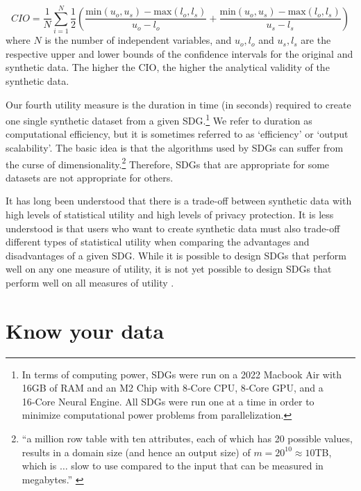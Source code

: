 \documentclass[runningheads]{llncs}
\begin{document}
\begin{equation}
    CIO = \frac{1}{N} \sum^{N}_{i=1} \frac{1}{2}\left(\frac{\text{min}(u_o,u_s) - \text{max}(l_o,l_s)}{u_o-l_o} + \frac{\text{min}(u_o,u_s) - \text{max}(l_o,l_s)}{u_s-l_s}\right)
\end{equation}
where $N$ is the number of independent variables, and $u_o,l_o$ and $u_s,l_s$ are the respective upper and lower bounds of the confidence intervals for the original and synthetic data.   The higher the CIO, the higher the analytical validity of the synthetic data.  

Our fourth utility measure is the duration in time (in seconds) required to create one single synthetic dataset from a given SDG.\footnote{In terms of computing power, SDGs were run on a 2022 Macbook Air with 16GB of RAM and an M2 Chip with 8‑Core CPU, 8‑Core GPU, and a 16‑Core Neural Engine.  All SDGs were run one at a time in order to minimize computational power problems from parallelization.}  We refer to duration as computational efficiency, but it is sometimes referred to as `efficiency'\cite{jordon2022synthetic} or `output scalability'\cite{zhang2017privbayes}.  The basic idea is that the algorithms used by SDGs can suffer from the curse of dimensionality.\footnote{``a million row table with ten attributes, each of which has 20 possible values, results in a domain size (and hence an output size) of $m = 20^{10} \approx 10$TB, which is $\dots$ slow to use compared to the input that can be measured in megabytes.'' \cite{zhang2017privbayes}}  Therefore, SDGs that are appropriate for some datasets are not appropriate for others.  

It has long been understood that there is a trade-off between synthetic data with high levels of statistical utility and high levels of privacy protection.  It is less understood is that users who want to create synthetic data must also trade-off different types of statistical utility when comparing the advantages and disadvantages of a given SDG.  While it is possible to design SDGs that perform well on any one measure of utility, it is not yet possible to design SDGs that perform well on all measures of utility \cite{drechsler2022challenges,jordon2022synthetic}.  


\section{Know your data}\label{sec:know_your_data}
\end{document}
